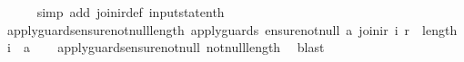 \begin{isabellebody}
\ \ \ \ \isamarkupfalse%
\ {\isacharparenleft}simp\ add{\isacharcolon}\ join{\isacharunderscore}ir{\isacharunderscore}def\ input{}state{\isacharunderscore}nth{\isacharparenright}\isanewline
{}\isamarkupfalse%
%
\endisatagproof
{\isafoldproof}%
%
\isadelimproof
\isanewline
%
\endisadelimproof
\isanewline
{}\isamarkupfalse%
\ apply{\isacharunderscore}guards{\isacharunderscore}ensure{\isacharunderscore}not{\isacharunderscore}null{\isacharunderscore}length{\isacharcolon}\ {\isachardoublequoteopen}apply{\isacharunderscore}guards\ {\isacharparenleft}ensure{\isacharunderscore}not{\isacharunderscore}null\ a{\isacharparenright}\ {\isacharparenleft}join{\isacharunderscore}ir\ i\ r{\isacharparenright}\ {\isacharequal}\ {\isacharparenleft}length\ i\ {\isasymge}\ a{\isacharparenright}{\isachardoublequoteclose}\isanewline
%
\isadelimproof
\ \ %
\endisadelimproof
%
\isatagproof
{}\isamarkupfalse%
\ apply{\isacharunderscore}guards{\isacharunderscore}ensure{\isacharunderscore}not{\isacharunderscore}null\ not{\isacharunderscore}null{\isacharunderscore}length\ \isamarkupfalse%
\ blast%
\endisatagproof
{\isafoldproof}%
%
\isadelimproof
\isanewline
%
\endisadelimproof
%
\isadelimtheory
\isanewline
%
\endisadelimtheory
%
\isatagtheory
{}\isamarkupfalse%
%
\endisatagtheory
{\isafoldtheory}%
%
\isadelimtheory
%
\endisadelimtheory
%
\end{isabellebody}%
\endinput
